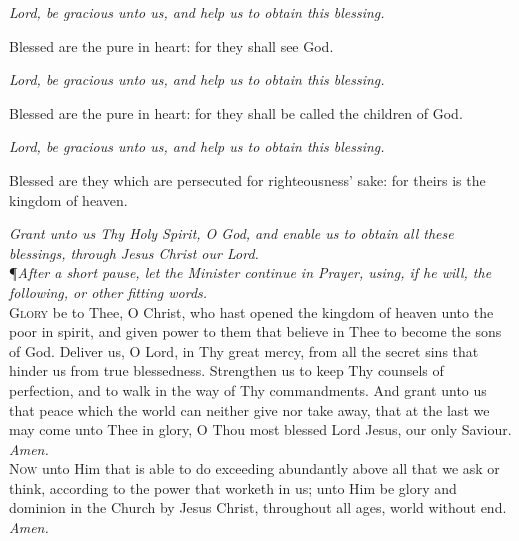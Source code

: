 \textit{Lord, be gracious unto us, and help us to obtain this blessing.}   

Blessed are the pure in heart: for they shall see God.

\textit{Lord, be gracious unto us, and help us to obtain this blessing.}   

Blessed are the pure in heart: for they shall be called the children of God.

\textit{Lord, be gracious unto us, and help us to obtain this blessing.}   

Blessed are they which are persecuted for righteousness' sake: for theirs is the kingdom of heaven.

\textit{Grant unto us Thy Holy Spirit, O God, and enable us to obtain all these blessings, through Jesus Christ our Lord.} \\

\noindent\P\textit{After a short pause, let the Minister continue in Prayer, using, if he will, the following, or other fitting words.} \\

\noindent\lettrine{G}{lory} be to Thee, O Christ, who hast opened the kingdom of heaven unto the poor in spirit, and given power to them that believe in Thee to become the sons of God.
Deliver us, O Lord, in Thy great mercy, from all the secret sins that hinder us from true blessedness.
Strengthen us to keep Thy counsels of perfection, and to walk in the way of Thy commandments.
And grant unto us that peace which the world can neither give nor take away, that at the last we may come unto Thee in glory, O Thou most blessed Lord Jesus, our only Saviour.  
\textit{Amen.} \\

\noindent\lettrine{N}{ow} unto Him that is able to do exceeding abundantly above all that we ask or think, according to the power that worketh in us; unto Him be glory and dominion in the Church by Jesus Christ, throughout all ages, world without end.
\textit{Amen.} 

